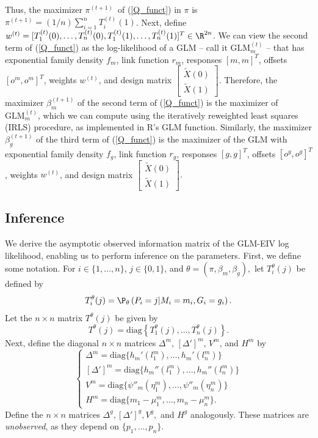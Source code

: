 \documentclass[12pt]{article}
\begin{document}
\begin{appendices}
Thus, the maximizer $\pi^{(t+1)}$ of (\ref{Q_funct}) in $\pi$ is $\pi^{(t+1)} = (1/n)\sum_{i=1}^n T^{(t)}_i(1)$. Next, define $w^{(t)} = [T^{(t)}_1(0), \dots, T^{(t)}_n(0), T^{(t)}_1(1), \dots, T^{(t)}_n(1)]^T \in \R^{2n}$. We can view the second term of (\ref{Q_funct}) as the log-likelihood of a GLM -- call it $\textrm{GLM}^{(t)}_m$ -- that has exponential family density $f_m$, link function $r_m$, responses $[m,m]^T$, offsets $[o^m, o^m]^T$, weights $w^{(t)}$, and design matrix $\begin{bmatrix} \tilde{X}(0) \\ \tilde{X}(1) \end{bmatrix}.$ Therefore, the maximizer $\beta^{(t+1)}_m$ of the second term of (\ref{Q_funct}) is the maximizer of $\textrm{GLM}^{(t)}_m$, which we can compute using the iteratively reweighted least squares (IRLS) procedure, as implemented in R's GLM function. Similarly, the maximizer $\beta^{(t+1)}_g$ of the third term of (\ref{Q_funct}) is the maximizer of the GLM with exponential family density $f_g$, link function $r_g$, responses $[g,g]^T$, offsets $[o^g, o^g]^T$, weights $w^{(t)}$, and design matrix $\begin{bmatrix} \tilde{X}(0) \\ \tilde{X}(1) \end{bmatrix}.$

\subsection{Inference}
We derive the asymptotic observed information matrix of the GLM-EIV log likelihood, enabling us to perform inference on the parameters. First, we define some notation. For $i \in \{1, \dots, n\}$, $j \in \{0, 1\}$, and $\theta = (\pi, \beta_m, \beta_g),$ let $T^\theta_i(j)$ be defined by
$$T^\theta_i(j) = \P_\theta\left(P_i = j | M_i = m_i, G_i = g_i\right).$$ Let the $n \times n$ matrix $T^\theta(j)$ be given by $$T^\theta(j) = \textrm{diag}\left\{T^\theta_1(j), \dots, T^\theta_n(j)\right\}.$$
Next, define the diagonal $n \times n$ matrices $\Delta^m$, $[\Delta']^m$, $V^m$, and $H^m$ by
$$
\begin{cases}
	\Delta^m = \textrm{diag} \{h_m'(l_1^m), \dots, h_m'(l_n^m)\} \\
	[\Delta']^m = \textrm{diag} \{h_m''(l_1^m), \dots, h_m''(l_n^m) \} \\
	V^m = \textrm{diag} \{ \psi''_m( \eta^m_1), \dots, \psi''_m( \eta^m_n) \} \\
	H^m = \textrm{diag} \{ m_1 - \mu_1^m, \dots, m_n - \mu_n^m\}.
\end{cases} 
$$ Define the $n \times n$ matrices $\Delta^g, [\Delta']^g, V^g,$ and $H^g$ analogously. These matrices are \textit{unobserved}, as they depend on $\{p_1, \dots, p_n\}$.


\end{appendices}
\end{document}
